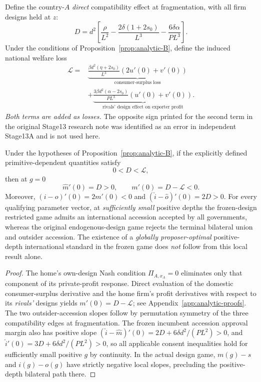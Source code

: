 Define the country-$A$ \emph{direct} compatibility effect
at fragmentation, with all firm designs held at $z$:
\begin{equation}\label{eq:analytic-direct}
 D=d^2\left[
 \frac{\rho}{L^2}
 -\frac{2\delta(1+2s_0)}{L^3}
 -\frac{6\delta\alpha}{PL^3}\right].
\end{equation}
Under the conditions of Proposition~\ref{prop:analytic-B},
define the induced national welfare loss
\begin{equation}\label{eq:analytic-loss}
 \begin{split}
 \mathcal L={}&
 \underbrace{\frac{\beta d^2(\eta+2s_0)}{L^3}
          (2u'(0)+v'(0))}_{\text{consumer-surplus loss}}\\
 &+\underbrace{\frac{3\beta d^2(\alpha-2s_0)}{PL^3}
          (u'(0)+v'(0))}_{\text{rivals' design effect on exporter profit}}.
 \end{split}
\end{equation}
\emph{Both terms are added as losses.}
The opposite sign printed for the second term
in the original Stage13 research note was
identified as an error in independent Stage13A
and is not used here.

\begin{proposition}
\label{prop:analytic-C}
Under the hypotheses of Proposition~\ref{prop:analytic-B},
if the explicitly defined primitive-dependent quantities
satisfy
\begin{equation}\label{eq:analytic-C-conditions}
 0<D<\mathcal L,
\end{equation}
then at $g=0$
\[
 \widehat m'(0)=D>0,\qquad
 m'(0)=D-\mathcal L<0.
\]
Moreover,
$(i-o)'(0)=2m'(0)<0$ and
$(\widehat i-\widehat o)'(0)=2D>0$.
For every qualifying parameter vector,
at \emph{sufficiently small} positive depths
the frozen-design restricted game admits an
international accession accepted by all governments,
whereas the original endogenous-design game rejects
the terminal bilateral union and outsider accession.
The existence of a \emph{globally proposer-optimal}
positive-depth international standard in the frozen game
does \emph{not} follow from this local result alone.
\end{proposition}

\begin{proof}
The home's own-design Nash condition
$\Pi_{A,x_A}=0$ eliminates only that component
of its private-profit response. Direct evaluation
of the domestic consumer-surplus derivative and
the home firm's profit derivatives with respect to
its \emph{rivals'} designs yields
$m'(0)=D-\mathcal L$; see Appendix~\ref{app:analytic-proofs}.
The two outsider-accession slopes follow by permutation
symmetry of the three compatibility edges at fragmentation.
The frozen incumbent accession approval margin also has
positive slope
$(\widehat i-\widehat m)'(0)
=2D+6\delta d^2/(PL^2)>0$,
and $\widehat i'(0)=3D+6\delta d^2/(PL^2)>0$,
so all applicable consent inequalities hold for sufficiently
small positive $g$ by continuity. In the actual design game,
$m(g)-s$ and $i(g)-o(g)$ have strictly negative local
slopes, precluding the positive-depth bilateral path there.
\end{proof}

